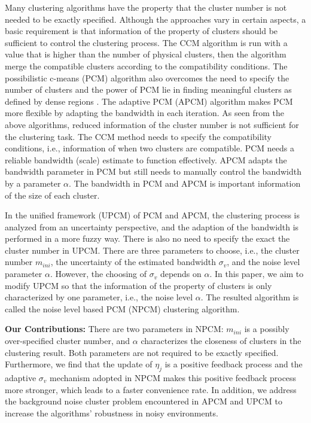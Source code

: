 \documentclass[conference]{IEEEtran}
\theoremstyle{definition}
\begin{document}
Many clustering algorithms have the property that the cluster number is not needed to be exactly specified.
Although the approaches vary in certain aspects, a basic requirement is that information of the property of clusters should be sufficient to control the clustering process.
The CCM algorithm \cite{krishnapuram_fitting_1992} is run with a value that is higher than the number of physical clusters, then the algorithm merge the compatible clusters according to the compatibility conditions. The possibilistic c-means (PCM) \cite{krishnapuram_possibilistic_1993} algorithm also overcomes the need to specify the number of clusters and the power of PCM lie in finding meaningful clusters as defined by dense regions \cite{krishnapuram_possibilistic_1996}. The adaptive PCM (APCM) \cite{xenaki_novel_2016} algorithm makes PCM more flexible by adapting the bandwidth in each iteration. As seen from the above algorithms, reduced information of the cluster number is not sufficient for the clustering task. The CCM method needs to specify the compatibility conditions, i.e., information of when two clusters are compatible. PCM needs a reliable bandwidth (scale) estimate to function effectively. APCM adapts the bandwidth parameter in PCM but still needs to manually control the bandwidth by a parameter $\alpha$. The bandwidth in PCM and APCM is important information of the size of each cluster.

In the unified framework (UPCM) \cite{hou_pcm_2016} of PCM and APCM, the clustering process is analyzed from an uncertainty perspective, and the adaption of the bandwidth is performed in a more fuzzy way. There is also no need to specify the exact the cluster number in UPCM. There are three parameters to choose, i.e., the cluster number $m_{ini}$, the uncertainty of the estimated bandwidth $\sigma_v$, and the noise level parameter $\alpha$. However, the choosing of $\sigma_v$ depends on $\alpha$. In this paper, we aim to modify UPCM so that the information of the property of clusters is only characterized by one parameter, i.e., the noise level $\alpha$. 
The resulted algorithm is called the noise level based PCM (NPCM) clustering algorithm.

\textbf{Our Contributions:}
There are two parameters in NPCM: $m_{ini}$ is a possibly over-specified cluster number, and $\alpha$ characterizes the closeness of clusters in the clustering result. Both parameters are not required to be exactly specified.
Furthermore, we find that the update of $\eta_j$ is a positive feedback process and the adaptive $\sigma_v$ mechanism adopted in NPCM makes this positive feedback process more stronger, which leads to a faster convenience rate.
In addition, we address the background noise cluster problem encountered in APCM and UPCM to increase the algorithms' robustness in noisy environments.
\end{document}
